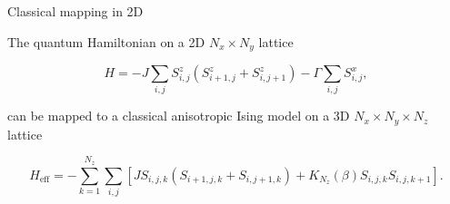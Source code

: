 \documentclass[aspectratio=169, xcolor=dvipsnames]{beamer}
\begin{document}
\begin{frame}{Classical mapping in 2D}
	
	The quantum Hamiltonian on a 2D $N_x\times N_y$ lattice
		
	\begin{equation*}
		H = -J\sum_{i,j}S^z_{i,j}\left(S^z_{i+1,j} + S^z_{i,j+1}\right) -\Gamma\sum_{i,j}S^x_{i,j},
	\end{equation*}
	
	can be mapped to a classical anisotropic Ising model on a 3D $N_x\times N_y \times N_z$ lattice
	
	\begin{equation*}
		H_\mathrm{eff} = -\sum_{k=1}^{N_z}\sum_{i,j}\left[J S_{i,j,k}\left(S_{i+1,j,k} + S_{i,j+1,k}\right) + K_{N_z}(\beta) S_{i,j,k}S_{i,j,k+1}\right].
	\end{equation*}
	
\end{frame}
\end{document}
